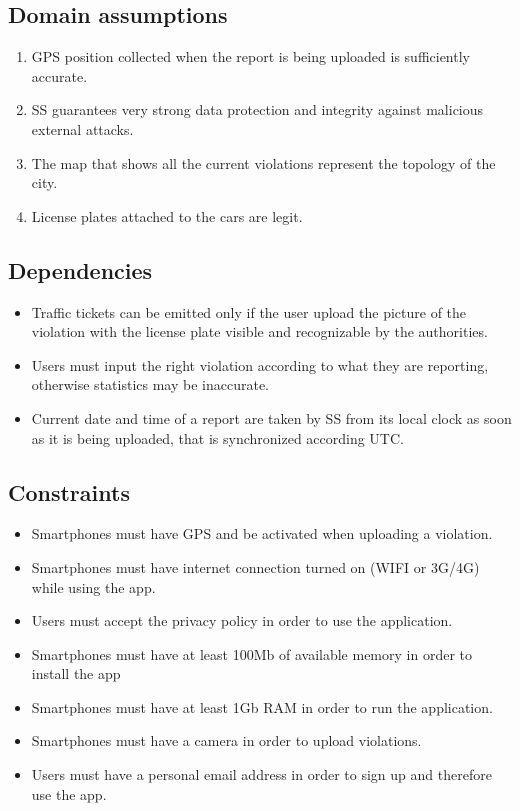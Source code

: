 \documentclass[a4paper, hidelinks, 12pt]{report}
\newcommand\assumption[1]{\item[{[D#1]}] }
\begin{document}
            \subsection{Domain assumptions}\label{subsec:domain-assumpiton}
                \begin{enumerate}
                    \assumption{1} GPS position collected when the report is being uploaded is sufficiently accurate.
                    \assumption{2}SS guarantees very strong data protection and integrity against malicious external attacks.
                    \assumption{3} The map that shows all the current violations represent the topology of the city.
                    \assumption{4} License plates attached to the cars are legit.
                \end{enumerate}
            \subsection{Dependencies}\label{subsec:dependencies}
            \begin{itemize}
                \item Traffic tickets can be emitted only if the user upload the picture of the violation with the license plate visible and recognizable by the authorities.
                \item Users must input the right violation according to what they are reporting, otherwise statistics may be inaccurate.
                \item Current date and time of a report are taken by SS from its local clock as soon as it is being uploaded, that is synchronized according UTC.
            \end{itemize}
            \subsection{Constraints}\label{subsec:constraints}
            \begin{itemize}
                \item Smartphones must have GPS and be activated when uploading a violation.
                \item Smartphones must have internet connection turned on (WIFI or 3G/4G) while using the app.
                \item Users must accept the privacy policy in order to use the application.
                \item Smartphones must have at least 100Mb of available memory in order to install the app
                \item Smartphones must have at least 1Gb RAM in order to run the application.
                \item Smartphones must have a camera in order to upload violations.
                \item Users must have a personal email address in order to sign up and therefore use the app.
            \end{itemize}
\end{document}
